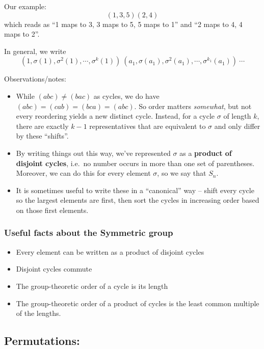 Our example: \[
(1,3,5)(2,4)
\] which reads as ``1 maps to 3, 3 maps to 5, 5 maps to 1'' and ``2 maps
to 4, 4 maps to 2''.

In general, we write \[
(1, \sigma(1), \sigma^2(1), \cdots, \sigma^{k}(1))~(a_1, \sigma(a_1), \sigma^2(a_1), \cdots, \sigma^{k_1}(a_1)) ~ \cdots
\]

Observations/notes:

\begin{itemize}
\tightlist
\item
  While \((abc) \neq (bac)\) as cycles, we do have
  \((abc) = (cab) = (bca) = (abc)\). So order matters \emph{somewhat},
  but not every reordering yields a new distinct cycle. Instead, for a
  cycle \(\sigma\) of length \(k\), there are exactly \(k-1\)
  representatives that are equivalent to \(\sigma\) and only differ by
  these ``shifts''.
\item
  By writing things out this way, we've represented \(\sigma\) as a
  \textbf{product of disjoint cycles}, i.e.~no number occurs in more
  than one set of parentheses. Moreover, we can do this for every
  element \(\sigma\), so we say that \(S_n\).
\item
  It is sometimes useful to write these in a ``canonical'' way -- shift
  every cycle so the largest elements are first, then sort the cycles in
  increasing order based on those first elements.
\end{itemize}

\hypertarget{useful-facts-about-the-symmetric-group}{%
\subsubsection{Useful facts about the Symmetric
group}\label{useful-facts-about-the-symmetric-group}}

\begin{itemize}
\tightlist
\item
  Every element can be written as a product of disjoint cycles
\item
  Disjoint cycles commute
\item
  The group-theoretic order of a cycle is its length
\item
  The group-theoretic order of a product of cycles is the least common
  multiple of the lengths.
\end{itemize}

\hypertarget{permutations}{%
\subsection{Permutations:}\label{permutations}}


